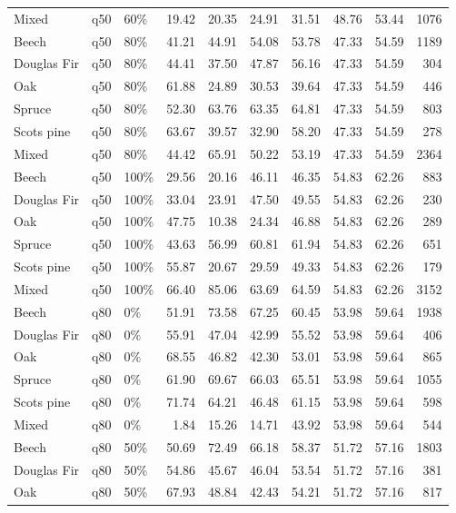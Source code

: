 \begin{longtable}{lllrrrrrrr}
  Mixed & q50 & 60\% & 19.42 & 20.35 & 24.91 & 31.51 & 48.76 & 53.44 & 1076 \\ 
  Beech & q50 & 80\% & 41.21 & 44.91 & 54.08 & 53.78 & 47.33 & 54.59 & 1189 \\ 
  Douglas Fir & q50 & 80\% & 44.41 & 37.50 & 47.87 & 56.16 & 47.33 & 54.59 & 304 \\ 
  Oak & q50 & 80\% & 61.88 & 24.89 & 30.53 & 39.64 & 47.33 & 54.59 & 446 \\ 
  Spruce & q50 & 80\% & 52.30 & 63.76 & 63.35 & 64.81 & 47.33 & 54.59 & 803 \\ 
  Scots pine & q50 & 80\% & 63.67 & 39.57 & 32.90 & 58.20 & 47.33 & 54.59 & 278 \\ 
  Mixed & q50 & 80\% & 44.42 & 65.91 & 50.22 & 53.19 & 47.33 & 54.59 & 2364 \\ 
  Beech & q50 & 100\% & 29.56 & 20.16 & 46.11 & 46.35 & 54.83 & 62.26 & 883 \\ 
  Douglas Fir & q50 & 100\% & 33.04 & 23.91 & 47.50 & 49.55 & 54.83 & 62.26 & 230 \\ 
  Oak & q50 & 100\% & 47.75 & 10.38 & 24.34 & 46.88 & 54.83 & 62.26 & 289 \\ 
  Spruce & q50 & 100\% & 43.63 & 56.99 & 60.81 & 61.94 & 54.83 & 62.26 & 651 \\ 
  Scots pine & q50 & 100\% & 55.87 & 20.67 & 29.59 & 49.33 & 54.83 & 62.26 & 179 \\ 
  Mixed & q50 & 100\% & 66.40 & 85.06 & 63.69 & 64.59 & 54.83 & 62.26 & 3152 \\ 
  Beech & q80 & 0\% & 51.91 & 73.58 & 67.25 & 60.45 & 53.98 & 59.64 & 1938 \\ 
  Douglas Fir & q80 & 0\% & 55.91 & 47.04 & 42.99 & 55.52 & 53.98 & 59.64 & 406 \\ 
  Oak & q80 & 0\% & 68.55 & 46.82 & 42.30 & 53.01 & 53.98 & 59.64 & 865 \\ 
  Spruce & q80 & 0\% & 61.90 & 69.67 & 66.03 & 65.51 & 53.98 & 59.64 & 1055 \\ 
  Scots pine & q80 & 0\% & 71.74 & 64.21 & 46.48 & 61.15 & 53.98 & 59.64 & 598 \\ 
  Mixed & q80 & 0\% & 1.84 & 15.26 & 14.71 & 43.92 & 53.98 & 59.64 & 544 \\ 
  Beech & q80 & 50\% & 50.69 & 72.49 & 66.18 & 58.37 & 51.72 & 57.16 & 1803 \\ 
  Douglas Fir & q80 & 50\% & 54.86 & 45.67 & 46.04 & 53.54 & 51.72 & 57.16 & 381 \\ 
  Oak & q80 & 50\% & 67.93 & 48.84 & 42.43 & 54.21 & 51.72 & 57.16 & 817 \\ 

\end{longtable}
